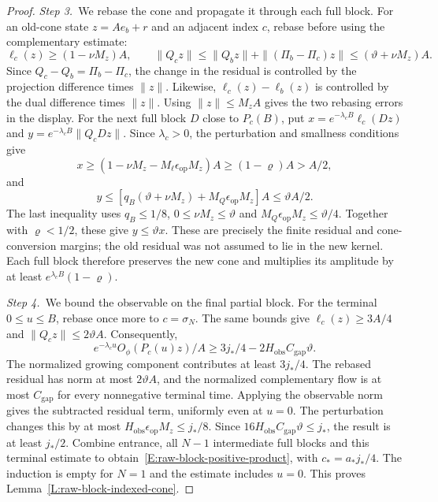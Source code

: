 \begin{proof}
  \medskip
  \noindent\textit{Step 3.~}We rebase the cone and propagate it through each
  full block.
  For an old-cone state $z = Ae_b+r$ and an adjacent index $c$, rebase before
  using the complementary estimate:
  \[
    \ell_c(z)\ge(1-\nu M_z)A,\qquad
    \|Q_cz\|\le\|Q_bz\|+\|(\Pi_b-\Pi_c)z\|
    \le(\vartheta+\nu M_z)A.
  \]
  Since $Q_c-Q_b=\Pi_b-\Pi_c$, the change in the residual is controlled by the
  projection difference times $\|z\|$. Likewise, $\ell_c(z)-\ell_b(z)$ is
  controlled by the dual difference times $\|z\|$. Using $\|z\|\le M_zA$ gives
  the two rebasing errors in the display.
  For the next full block $D$ close to $P_c(B)$, put $x =
  e^{-\lambda_cB}\ell_c(Dz)$ and $y = e^{-\lambda_cB}\|Q_cDz\|$. Since
  $\lambda_c > 0$, the perturbation and smallness conditions give
  \[
    x\ge(1-\nu M_z-M_\ell\epsilon_{\mathrm{op}}M_z)A
    \ge(1-\varrho)A>A/2,
  \]
  and
  \[
    y\le
    [q_B(\vartheta+\nu M_z)+M_Q\epsilon_{\mathrm{op}}M_z]A
    \le\vartheta A/2.
  \]
  The last inequality uses $q_B \le 1/8$, $0 \le \nu M_z \le \vartheta$ and
  $M_Q\epsilon_{\mathrm{op}}M_z \le \vartheta/4$. Together with $\varrho < 1/2$,
  these give $y \le \vartheta x$. These are precisely the finite residual and
  cone-conversion margins; the old residual was not assumed to lie in the new
  kernel. Each full block therefore preserves the new cone and multiplies its
  amplitude by at least $e^{\lambda_cB}(1-\varrho)$.


  \medskip
  \noindent\textit{Step 4.~}We bound the observable on the final partial
  block.
  For the terminal $0 \le u \le B$, rebase once more to $c = \sigma_N$. The same
  bounds give $\ell_c(z) \ge 3A/4$ and $\|Q_cz\| \le 2\vartheta A$.
  Consequently,
  \[
    e^{-\lambda_cu}O_\phi(P_c(u)z)/A
    \ge3j_*/4-2H_{\mathrm{obs}}C_{\mathrm{gap}}\vartheta.
  \]
  The normalized growing component contributes at least $3j_*/4$. The rebased
  residual has norm at most $2\vartheta A$, and the normalized complementary
  flow is at most $C_{\mathrm{gap}}$ for every nonnegative terminal time.
  Applying the observable norm gives the subtracted residual term, uniformly
  even at $u=0$.
  The perturbation changes this by at most
  $H_{\mathrm{obs}}\epsilon_{\mathrm{op}}M_z \le j_*/8$. Since
  $16H_{\mathrm{obs}}C_{\mathrm{gap}}\vartheta \le j_*$, the result is at least
  $j_*/2$. Combine entrance, all $N-1$ intermediate full blocks and this
  terminal estimate to obtain~\eqref{E:raw-block-positive-product}, with $c_* =
  a_*j_*/4$. The induction is empty for $N = 1$ and the estimate includes $u =
  0$. This proves Lemma~\ref{L:raw-block-indexed-cone}.
\end{proof}

